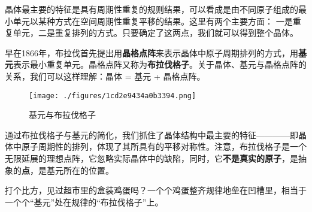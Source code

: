 
晶体最主要的特征是具有周期性重复的规则结果，可以看成是由不同原子组成的最小单元以某种方式在空间周期性重复平移的结果。这里有两个主要方面：
一是重复单元，二是重复排列的方式。只要确定了这两点，我们就可以得到整个晶体。

早在1866年，布拉伐首先提出用\textbf{晶格点阵}来表示晶体中原子周期排列的方式，用\textbf{基元}表示最小重复单元。晶格点阵又称为\textbf{布拉伐格子}。关于晶体、基元与晶格点阵的关系，我们可以这样理解：晶体 = 基元 + 晶格点阵。
\begin{figure}[ht]
\centering
\texttt{[image: ./figures/1cd2e9434a0b3394.png]}
\caption{ 基元与布拉伐格子} \label{fig_BraLat_1}
\end{figure}

通过布拉伐格子与基元的简化，我们抓住了晶体结构中最主要的特征————即晶体中原子周期性的排列，体现了其所具有的平移对称性。注意，布拉伐格子是一个无限延展的理想点阵，它忽略实际晶体中的缺陷，同时，它\textbf{不是真实的原子}，是抽象的\textbf{点}，是基元所在的位置。

打个比方，见过超市里的盒装鸡蛋吗？一个个鸡蛋整齐规律地垒在凹槽里，相当于一个个“基元”处在规律的“布拉伐格子”上。